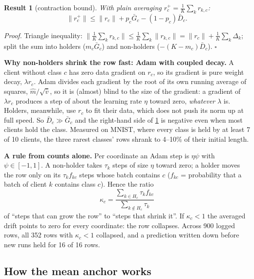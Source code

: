 \documentclass[11pt]{article}
\theoremstyle{plain}
\newtheorem{result}{Result}
\theoremstyle{definition}
\newcommand{\norm}[1]{\lVert #1\rVert}
\begin{document}
\begin{result}[contraction bound]\label{res:contraction}
With plain averaging $r_c^+=\frac1K\sum_kr_{k,c}$:
\[
\norm{r_c^+}\le\norm{r_c}+p_c\bar G_c-(1-p_c)\bar D_c .
\]
\end{result}
\emph{Proof.} Triangle inequality: $\norm{\frac1K\sum_kr_{k,c}}\le\frac1K\sum_k\norm{r_{k,c}}=\norm{r_c}+\frac1K\sum_k\Delta_k$;
split the sum into holders ($m_c\bar G_c$) and non-holders ($-(K-m_c)\bar D_c$). $\square$

\textbf{Why non-holders shrink the row fast: Adam with coupled decay.} A client without class $c$ has zero data
gradient on $r_c$, so its gradient is pure weight decay, $\lambda r_c$. Adam divides each gradient by the root of its
own running average of squares, $\hat m/\sqrt{\hat v}$, so it is (almost) blind to the size of the gradient: a gradient
of $\lambda r_c$ produces a step of about the learning rate $\eta$ toward zero, \emph{whatever} $\lambda$ is. Holders,
meanwhile, use $r_c$ to fit their data, which does not push its norm up at full speed. So $\bar D_c\gg\bar G_c$ and the
right-hand side of \cref{res:contraction} is negative even when most clients hold the class. Measured on MNIST, where
every class is held by at least 7 of 10 clients, the three rarest classes' rows shrank to 4--10\% of their initial
length.

\textbf{A rule from counts alone.} Per coordinate an Adam step is $\eta\psi$ with $\psi\in[-1,1]$. A non-holder
takes $\tau_k$ steps of size $\eta$ toward zero; a holder moves the row only on its $\tau_kf_{kc}$ steps whose batch
contains $c$ ($f_{kc}$ = probability that a batch of client $k$ contains class $c$). Hence the ratio
\[
\kappa_c=\frac{\sum_{k\in H_c}\tau_kf_{kc}}{\sum_{k\notin H_c}\tau_k}
\]
of ``steps that can grow the row'' to ``steps that shrink it''. If $\kappa_c<1$ the averaged drift points to zero for
every coordinate: the row collapses. Across 900 logged rows, all 352 rows with $\kappa_c<1$ collapsed, and a prediction
written down before new runs held for 16 of 16 rows.

\subsection{How the mean anchor works}
\end{document}
